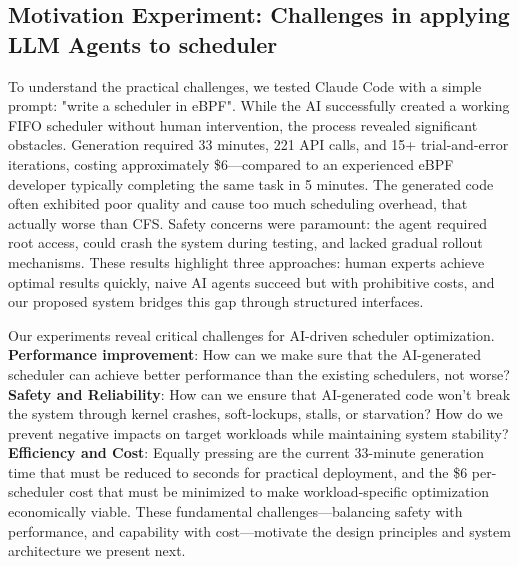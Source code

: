 \subsection{Motivation Experiment: Challenges in applying LLM Agents to scheduler}

To understand the practical challenges, we tested Claude Code with a simple prompt: "write a scheduler in eBPF". While the AI successfully created a working FIFO scheduler without human intervention, the process revealed significant obstacles. Generation required 33 minutes, 221 API calls, and 15+ trial-and-error iterations, costing approximately \$6—compared to an experienced eBPF developer typically completing the same task in 5 minutes. The generated code often exhibited poor quality and cause too much scheduling overhead, that actually worse than CFS. Safety concerns were paramount: the agent required root access, could crash the system during testing, and lacked gradual rollout mechanisms. These results highlight three approaches: human experts achieve optimal results quickly, naive AI agents succeed but with prohibitive costs, and our proposed system bridges this gap through structured interfaces.

Our experiments reveal critical challenges for AI-driven scheduler optimization. \textbf{Performance improvement}: How can we make sure that the AI-generated scheduler can achieve better performance than the existing schedulers, not worse? \textbf{Safety and Reliability}: How can we ensure that AI-generated code won't break the system through kernel crashes, soft-lockups, stalls, or starvation? How do we prevent negative impacts on target workloads while maintaining system stability? \textbf{Efficiency and Cost}: Equally pressing are the current 33-minute generation time that must be reduced to seconds for practical deployment, and the \$6 per-scheduler cost that must be minimized to make workload-specific optimization economically viable. These fundamental challenges—balancing safety with performance, and capability with cost—motivate the design principles and system architecture we present next.